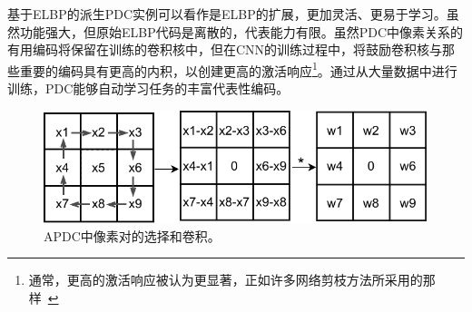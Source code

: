 \documentclass[10pt,twocolumn,letterpaper]{article}
\begin{document}
基于ELBP的派生PDC实例可以看作是ELBP的扩展，更加灵活、更易于学习。虽然功能强大，但原始ELBP代码是离散的，代表能力有限。虽然PDC中像素关系的有用编码将保留在训练的卷积核中，但在CNN的训练过程中，将鼓励卷积核与那些重要的编码具有更高的内积，以创建更高的激活响应\footnote{通常，更高的激活响应被认为更显著，正如许多网络剪枝方法所采用的那样~\cite{han2015deepcompression, su2020dynamic}}。通过从大量数据中进行训练，PDC能够自动学习任务的丰富代表性编码。

\begin{figure}[h]
    \centering
    \includegraphics[width=0.8\linewidth]{images/APDC.pdf}
    \caption{APDC中像素对的选择和卷积。}
    \label{fig:apdc}
\end{figure}
\end{document}
